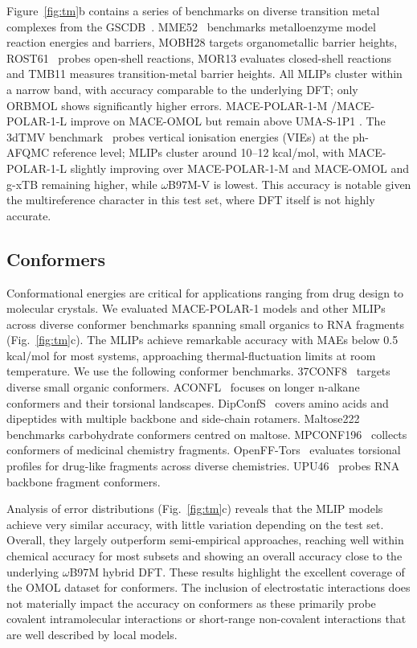 \documentclass[aps,%
superscriptaddress,
 amsmath,amssymb,
floatfix,
twocolumn
]{revtex4-2}
\newcommand{\MOMOL}{MACE-OMOL }
\newcommand{\MFP}{MACE-POLAR-1 }
\newcommand{\MFPM}{MACE-POLAR-1-M }
\newcommand{\MFPL}{MACE-POLAR-1-L }
\newcommand{\UMAS}{UMA-S-1P1 }
\newcommand{\ORBMOL}{ORBMOL }
\begin{document}
%
Figure~\ref{fig:tm}b contains a series of benchmarks on diverse transition metal complexes from the GSCDB~\cite{Liang2025}.
MME52~\cite{Wappett2023} benchmarks metalloenzyme model reaction energies and barriers, MOBH28 targets organometallic barrier heights, ROST61~\cite{maurer2021assessing} probes open-shell reactions, MOR13 evaluates closed-shell reactions and TMB11 measures transition-metal barrier heights. All MLIPs cluster within a narrow band, with accuracy comparable to the underlying DFT; only \ORBMOL shows significantly higher errors. \MFPM/\MFPL improve on \MOMOL but remain above \UMAS.
%
The 3dTMV benchmark~\cite{Neugebauer2023} probes vertical ionisation energies (VIEs) at the ph-AFQMC reference level; MLIPs cluster around 10--12 kcal/mol, with \MFPL slightly improving over \MFPM and \MOMOL and g-xTB remaining higher, while $\omega$B97M-V is lowest. This accuracy is notable given the multireference character in this test set, where DFT itself is not highly accurate.
%

\subsection{Conformers}


Conformational energies are critical for applications ranging from drug design to molecular crystals. We evaluated \MFP models and other MLIPs across diverse conformer benchmarks spanning small organics to RNA fragments (Fig.~\ref{fig:tm}c). The MLIPs achieve remarkable accuracy with MAEs below 0.5 kcal/mol for most systems, approaching thermal-fluctuation limits at room temperature.
%
We use the following conformer benchmarks. 37CONF8~\cite{sharapa2019robust} targets diverse small organic conformers. ACONFL~\cite{ehlert2022conformational, werner2023accurate} focuses on longer n-alkane conformers and their torsional landscapes. DipConfS~\cite{plett2024toward} covers amino acids and dipeptides with multiple backbone and side-chain rotamers. Maltose222~\cite{marianski2016assessing} benchmarks carbohydrate conformers centred on maltose. MPCONF196~\cite{rezac2018mpconf196,plett2023mpconf196water} collects conformers of medicinal chemistry fragments. OpenFF-Tors~\cite{behara2024openff} evaluates torsional profiles for drug-like fragments across diverse chemistries. UPU46~\cite{kruse2015quantum} probes RNA backbone fragment conformers.

Analysis of error distributions (Fig.~\ref{fig:tm}c) reveals that the MLIP models achieve very similar accuracy, with little variation depending on the test set. Overall, they largely outperform semi-empirical approaches, reaching well within chemical accuracy for most subsets and showing an overall accuracy close to the underlying $\omega$B97M hybrid DFT. These results highlight the excellent coverage of the OMOL dataset for conformers. The inclusion of electrostatic interactions does not materially impact the accuracy on conformers as these primarily probe covalent intramolecular interactions or short-range non-covalent interactions that are well described by local models.
\end{document}
